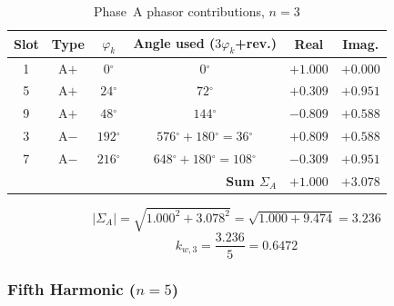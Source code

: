 \documentclass[12pt,a4paper]{article}
\newcommand{\degree}{\ensuremath{^{\circ}}}
\begin{document}
\begin{table}[H]
  \centering\small
  \caption{Phase~A phasor contributions, $n=3$}
  \label{tab:q2_ph3}
  \begin{tabular}{cccccc}
    \toprule
    Slot & Type & $\varphi_k$ & Angle used ($3\varphi_k$+rev.) & Real & Imag. \\
    \midrule
    1 & A$+$ & $  0\degree$ & $  0\degree$                    & $+1.000$ & $+0.000$ \\
    5 & A$+$ & $ 24\degree$ & $ 72\degree$                    & $+0.309$ & $+0.951$ \\
    9 & A$+$ & $ 48\degree$ & $144\degree$                    & $-0.809$ & $+0.588$ \\
    3 & A$-$ & $192\degree$ & $576\degree+180\degree=36\degree$ & $+0.809$ & $+0.588$ \\
    7 & A$-$ & $216\degree$ & $648\degree+180\degree=108\degree$ & $-0.309$ & $+0.951$ \\
    \midrule
    \multicolumn{4}{r}{\textbf{Sum $\Sigma_A$}} & $+1.000$ & $+3.078$ \\
    \bottomrule
  \end{tabular}
\end{table}
\begin{equation}
  |\Sigma_A| = \sqrt{1.000^2 + 3.078^2} = \sqrt{1.000 + 9.474} = 3.236
\end{equation}
\begin{equation}
  \boxed{k_{w,3} = \frac{3.236}{5} = 0.6472}
\end{equation}

\subsubsection{Fifth Harmonic ($n = 5$)}
\end{document}
